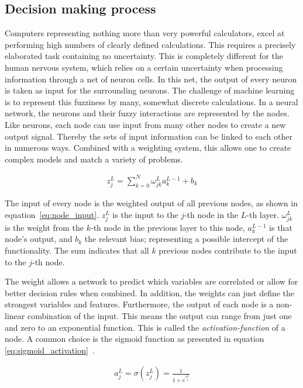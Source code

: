 \subsection{Decision making process}

Computers representing nothing more than very powerful calculators, excel at performing high numbers of clearly defined calculations. This requires a precisely elaborated task containing no uncertainty.
This is completely different for the human nervous system, which relies on a certain uncertainty when processing information through a net of neuron cells. In this net, the output of every neuron is taken as input for the surrounding neurons. The challenge of machine learning is to represent this fuzziness by many, somewhat discrete calculations. In a neural network, the neurons and their fuzzy interactions are represented by the nodes. Like neurons, each node can use input from many other nodes to create a new output signal. Thereby the sets of input information can be linked to each other in numerous ways. Combined with a weighting system, this allows one to create complex models and match a variety of problems.

\begin{align}
    z_j^L = \sum_{k=0}^{N} \omega_{jk}^L a_k^{L-1} + b_k
    \label{eq:node_input}
\end{align}

The input of every node is the weighted output of all previous nodes, as shown in equation~\eqref{eq:node_input}. $z_j^L$ is the input to the $j$-th node in the $L$-th layer. $\omega_{jk}^L$ is the weight from the $k$-th node in the previous layer to this node, $a_k^{L-1}$ is that node's output, and $b_k$ the relevant bias; representing a possible intercept of the functionality. The sum indicates that all $k$ previous nodes contribute to the input to the $j$-th node.


The weight allows a network to predict which variables are correlated or allow for better decision rules when combined. In addition, the weights can just define the strongest variables and features. Furthermore, the output of each node is a non-linear combination of the input. This means the output can range from just one and zero to an exponential function. This is called the \emph{activation-function} of a node. A common choice is the sigmoid function as presented in equation \eqref{eq:sigmoid_activation}~\cite{chollet2015keras}.

\begin{align}
    a_j^L = \sigma ( z_j^L ) = \frac{1}{1 + e^{z_j^L}}
    \label{eq:sigmoid_activation}
\end{align}

